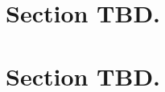 \setcounter{page}{1}
\pagestyle{fancy}
\fancyhead[L]{\myassignment - \mycourse} 
\fancyhead[R]{\mydate}


\section{Section TBD.}
\lipsum[1-4]
\cite{aha1991}


\section{Section TBD.}
\lipsum[1-4]


